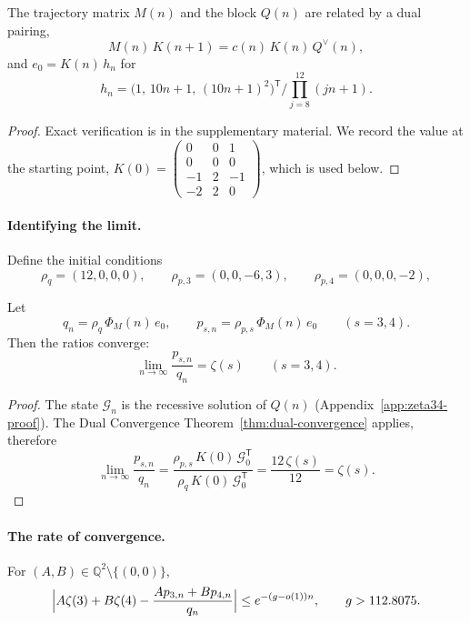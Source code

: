 \begin{lemma}\label{prop:z34-connection}
The trajectory matrix $M(n)$ and the block $Q(n)$ are related by a dual
pairing,
\[
  M(n)\,K(n+1)=c(n)\,K(n)\,Q^\vee(n),
\]
and $e_0=K(n)\,h_n$ for
\[
h_n=\bigl(1,\,10n+1,\,(10n+1)^2\bigr)^{\mathsf T}/\prod_{j=8}^{12}(jn+1).\]
\end{lemma}

\begin{proof}
Exact verification is in the supplementary material. We record the value at the starting point,
$K(0)=\left(\begin{smallmatrix}0&0&1\\0&0&0\\-1&2&-1\\-2&2&0\end{smallmatrix}\right)$,
which is used below.
\end{proof}

\paragraph{Identifying the limit.}
\label{subsubsec:z34-constants}

Define the initial conditions
\[
  \rho_q=(12,0,0,0),\qquad \rho_{p,3}=(0,0,-6,3),\qquad
  \rho_{p,4}=(0,0,0,-2),
\]
\begin{lemma}\label{lem:z34-limits}
Let
\[
  q_n=\rho_q\,\Phi_M(n)\,e_0,\qquad
    p_{s,n}=\rho_{p,s}\,\Phi_M(n)\,e_0\qquad(s=3,4).
\]
Then the ratios converge:
\[
  \lim_{n\to\infty}\frac{p_{s,n}}{q_n}=\zeta(s)\qquad(s=3,4).
\]
\end{lemma}

\begin{proof}
The state $\mathcal G_n$ is the recessive solution of $Q(n)$ (Appendix~\ref{app:zeta34-proof}).  The Dual Convergence Theorem~\ref{thm:dual-convergence} applies, therefore
\[
  \lim_{n\to\infty}\frac{p_{s,n}}{q_n}
  =\frac{\rho_{p,s}\,K(0)\,\mathcal G_0^{\mathsf T}}{\rho_q\,K(0)\,\mathcal G_0^{\mathsf T}}
  =\frac{12\,\zeta(s)}{12}=\zeta(s).
\]
\end{proof}

%
\paragraph{The rate of convergence.}
\label{subsubsec:z34-error}

\begin{lemma}\label{lem:z34-selected-error}
For $(A,B)\in\mathbb Q^2\setminus\{(0,0)\}$,
\[
  \Bigl|A\zeta(3)+B\zeta(4)-\frac{Ap_{3,n}+Bp_{4,n}}{q_n}\Bigr|
  \le e^{-(g-o(1))n},\qquad g>112.8075 .
\]
\end{lemma}

